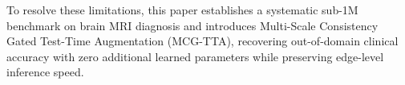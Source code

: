 To resolve these limitations, this paper establishes a systematic sub-1M benchmark on brain MRI diagnosis and introduces Multi-Scale Consistency Gated Test-Time Augmentation (MCG-TTA), recovering out-of-domain clinical accuracy with zero additional learned parameters while preserving edge-level inference speed.
